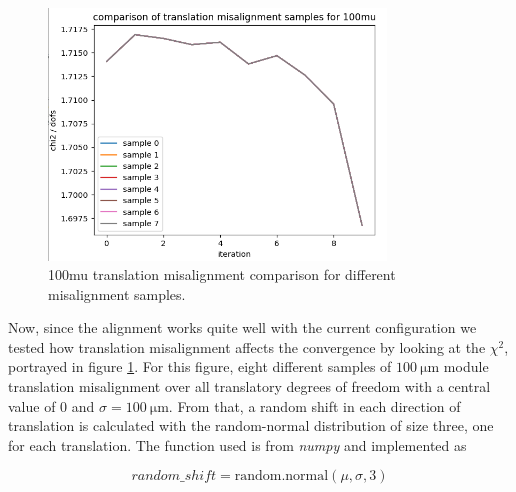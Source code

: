 %

\begin{figure}
  \centering
  \includegraphics[width=0.8\textwidth]{plots/feb_6_2022/100mu_misalignment_samples_compared.png}
  \caption{100mu translation misalignment comparison for different misalignment samples.}
  \label{fig:100muT}
\end{figure}

Now, since the alignment works quite well with the current configuration we
tested how translation misalignment affects the convergence by looking at the
$\chi^2$, portrayed in figure \ref{fig:100muT}. For this figure, eight different samples of $\SI{100}{\micro\metre}$ module translation misalignment over all translatory
degrees of freedom with a central value of 0 and $\sigma = \SI{100}{\micro\metre}$.
From that, a random shift in each direction of translation is calculated with the random-normal distribution of size three, one for each translation. The function used is from \textit{numpy} and implemented as

\begin{equation*}
  random\_shift = \text{random.normal}(\mu, \sigma, 3)
\end{equation*}

